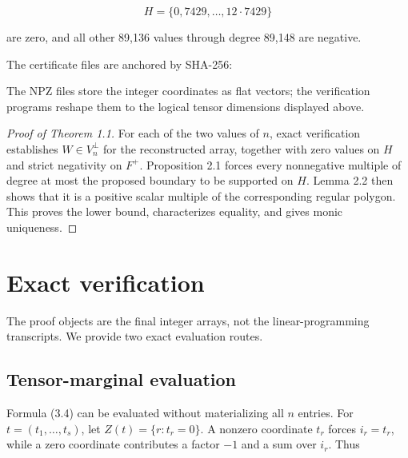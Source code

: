 \documentclass[11pt]{article}
\numberwithin{equation}{section}
\begin{document}
\nopagebreak[4]
\[
H=\{0,7429,\ldots,12\cdot7429\}
\]

are zero, and all other 89,136 values through degree 89,148 are negative.

The certificate files are anchored by SHA-256:

\begin{center}
\small
{}
\end{center}


The NPZ files store the integer coordinates as flat vectors; the verification
programs reshape them to the logical tensor dimensions displayed above.

\begin{proof}[Proof of Theorem 1.1]

For each of the two values of $n$, exact verification establishes
$W\in V_n^\perp$ for the reconstructed array, together with zero values on
$H$ and strict negativity on $F^+$. Proposition 2.1 forces every nonnegative multiple of degree at most the
proposed boundary to be supported on $H$. Lemma 2.2 then shows that it is a
positive scalar multiple of the corresponding regular polygon. This proves
the lower bound, characterizes equality, and gives monic uniqueness.
\end{proof}


\section{Exact verification}


The proof objects are the final integer arrays, not the linear-programming
transcripts. We provide two exact evaluation routes.

\subsection{Tensor-marginal evaluation}


Formula (3.4) can be evaluated without materializing all $n$ entries. For
$t=(t_1,\ldots,t_s)$, let $Z(t)=\{r:t_r=0\}$. A nonzero coordinate $t_r$
forces $i_r=t_r$, while a zero coordinate contributes a factor $-1$ and a sum
over $i_r$. Thus
\end{document}
